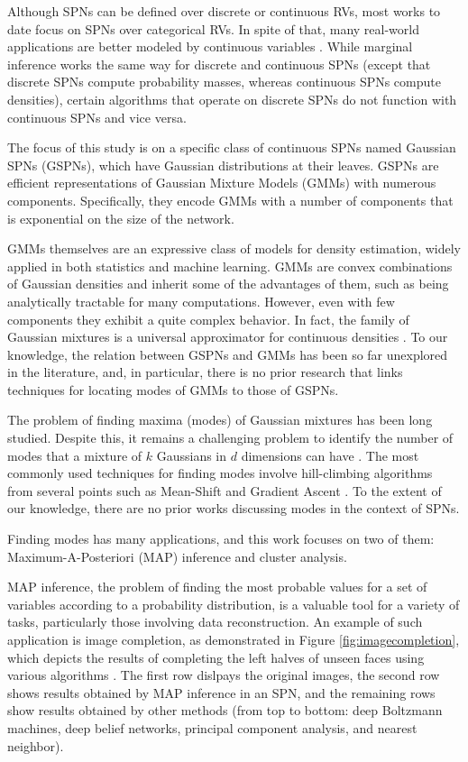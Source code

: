 Although SPNs can be defined over discrete or continuous RVs, most works to date focus on SPNs over categorical RVs. In spite of that, many real-world applications are better modeled by continuous variables \citep{Jaini2016}. While marginal inference works the same way for discrete and continuous SPNs (except that discrete SPNs compute probability masses, whereas continuous SPNs compute densities), certain algorithms that operate on discrete SPNs do not function with continuous SPNs and vice versa.

The focus of this study is on a specific class of continuous SPNs named Gaussian SPNs (GSPNs), which have Gaussian distributions at their leaves. GSPNs are efficient representations of Gaussian Mixture Models (GMMs) with numerous components. Specifically, they encode GMMs with a number of components that is exponential on the size of the network.

GMMs themselves are an expressive class of models for density estimation, widely applied in both statistics and machine learning. GMMs are convex combinations of Gaussian densities and inherit some of the advantages of them, such as being analytically tractable for many computations. However, even with few components they exhibit a quite complex behavior. In fact, the family of Gaussian mixtures is a universal approximator for continuous densities \citep{Titterington1985}. To our knowledge, the relation between GSPNs and GMMs has been so far unexplored in the literature, and, in particular, there is no prior research that links techniques for locating modes of GMMs to those of GSPNs.

The problem of finding maxima (modes) of Gaussian mixtures has been long studied. Despite this, it remains a challenging problem to identify the number of modes that a mixture of $k$ Gaussians in $d$ dimensions can have \citep{Amendola2019}. The most commonly used techniques for finding modes involve hill-climbing algorithms from several points such as Mean-Shift \citep{Fukunaga1975, Carreira-Perpinan2015} and Gradient Ascent \citep{Murphy2012}. To the extent of our knowledge, there are no prior works discussing modes in the context of SPNs.

Finding modes has many applications, and this work focuses on two of them: Maximum-A-Posteriori (MAP) inference and cluster analysis.

MAP inference, the problem of finding the most probable values for a set of variables according to a probability distribution, is a valuable tool for a variety of tasks, particularly those involving data reconstruction. An example of such application is image completion, as demonstrated in Figure \ref{fig:imagecompletion}, which depicts the results of completing the left halves of unseen faces using various algorithms \citep{Poon2011}. The first row dislpays the original images, the second row shows results obtained by MAP inference in an SPN, and the remaining rows show results obtained by other methods (from top to bottom: deep Boltzmann machines, deep belief networks, principal component analysis, and nearest neighbor).

